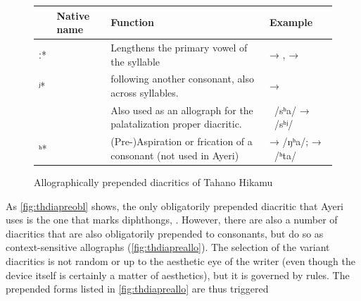
\begin{figure}[htp]
\caption{Allographically prepended diacritics of Tahano Hikamu}
\begin{tabu} to 
\toprule
\tableheaderfont

	& Native name
	& Function
	& Example
	\\
	
\toprule

ː*
	& 
	& Lengthens the primary vowel of the syllable
	&  → ,\newline
		 → 
	\\
	
\midrule

ʲ*
	& 
	&  following another consonant, also across syllables.
	&  → 
	\\
	
	
	& 
	& Also used as an allograph for the palatalization proper diacritic.
	& ~/sʰa/ → ~/sʰʲ/
	\\
	
\midrule

ʰ*
	& 
	& (Pre-)Aspiration or frication of a consonant (not used in Ayeri)
	&  →  /ŋʰa/;\newline
		 → ~/ʰta/
	\\

\bottomrule
\end{tabu}
\label{fig:thdiapreallo}
\end{figure}

As \autoref{fig:thdiapreobl} shows, the only obligatorily prepended diacritic 
that Ayeri uses is the one that marks diphthongs, . 
However, there are also a number of diacritics that are also obligatorily 
prepended to consonants, but do so as context-sensitive allographs 
(\autoref{fig:thdiapreallo}). The selection of the variant diacritics is not 
random or up to the aesthetic eye of the writer (even though the device itself 
is certainly a matter of aesthetics), but it is governed by rules. The 
prepended forms listed in \autoref{fig:thdiapreallo} are thus triggered 


